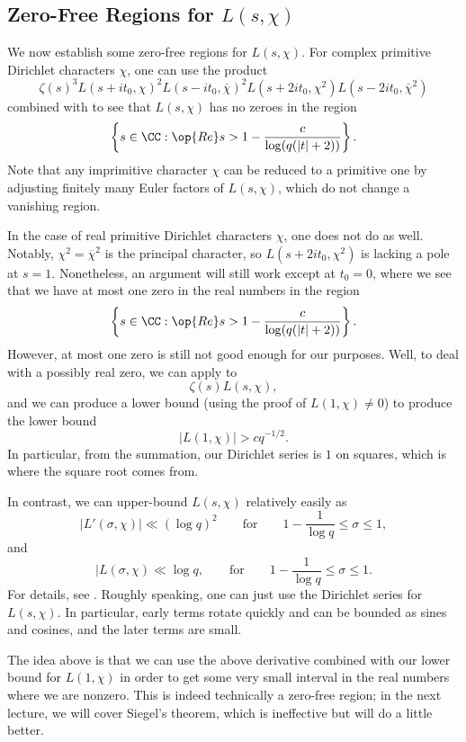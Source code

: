 \documentclass[../notes.tex]{subfiles}
\begin{document}
\subsection{Zero-Free Regions for \texorpdfstring{$L(s,\chi)$}{ L(s, chi)}}
We now establish some zero-free regions for $L(s,\chi)$. For complex primitive Dirichlet characters $\chi$, one can use the product
\[\zeta(s)^3L(s+it_0,\chi)^2L(s-it_0,\overline\chi)^2L(s+2it_0,\chi^2)L(s-2it_0,\overline\chi^2)\]
combined with  to see that $L(s,\chi)$ has no zeroes in the region
\[\left\{s\in\CC:\op{Re}s>1-\frac c{\log(q(|t|+2))}\right\}.\]
Note that any imprimitive character $\chi$ can be reduced to a primitive one by adjusting finitely many Euler factors of $L(s,\chi)$, which do not change a vanishing region.

In the case of real primitive Dirichlet characters $\chi$, one does not do as well. Notably, $\chi^2=\overline\chi^2$ is the principal character, so $L(s+2it_0,\chi^2)$ is lacking a pole at $s=1$. Nonetheless, an argument will still work except at $t_0=0$, where we see that we have at most one zero in the real numbers in the region
\[\left\{s\in\CC:\op{Re}s>1-\frac c{\log(q(|t|+2))}\right\}.\]
However, at most one zero is still not good enough for our purposes. Well, to deal with a possibly real zero, we can apply  to
\[\zeta(s)L(s,\chi),\]
and we can produce a lower bound (using the proof of $L(1,\chi)\ne0$) to produce the lower bound
\[|L(1,\chi)|>cq^{-1/2}.\]
In particular, from the summation, our Dirichlet series is $1$ on squares, which is where the square root comes from.
\begin{remark}
	In contrast, we can upper-bound $L(s,\chi)$ relatively easily as
	\[|L'(\sigma,\chi)|\ll(\log q)^2\qquad\text{for}\qquad1-\frac1{\log q}\le\sigma\le1,\]
	and
	\[|L(\sigma,\chi)\ll\log q,\qquad\text{for}\qquad1-\frac1{\log q}\le\sigma\le1.\]
	For details, see \cite[Chapter~14]{davenport-mult-nt}. Roughly speaking, one can just use the Dirichlet series for $L(s,\chi)$. In particular, early terms rotate quickly and can be bounded as sines and cosines, and the later terms are small.
\end{remark}
The idea above is that we can use the above derivative combined with our lower bound for $L(1,\chi)$ in order to get some very small interval in the real numbers where we are nonzero. This is indeed technically a zero-free region; in the next lecture, we will cover Siegel's theorem, which is ineffective but will do a little better.
\end{document}
